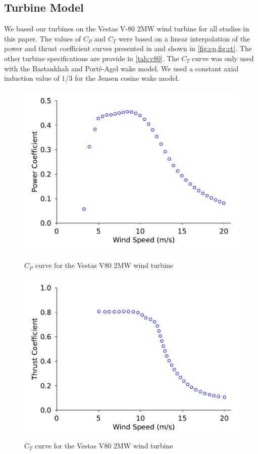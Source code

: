 \documentclass[a4paper]{jpconf}
\begin{document}
\subsection{Turbine Model}
We based our turbines on the Vestas V-80 2MW wind turbine for all studies in this paper. The values of $C_P$ and $C_T$ were based on a linear interpolation of the power and thrust coefficient curves presented in \cite{niayifar2016} and shown in \cref{fig:cp,fig:ct}. The other turbine specifications are provide in \cref{tab:v80}. The $C_T$ curve was only used with the Bastankhah and Port\'e-Agel wake model. We used a constant axial induction value of 1/3 for the Jensen cosine wake model.
%
\begin{figure}[htp]
	\centering
	\begin{minipage}[t]{0.48\textwidth}
		\centering
		\includegraphics[width=\textwidth, trim={0cm 0cm 0cm 0cm}, clip]{cp_curve_v80}
		\caption{$C_P$ curve for the Vestas V80 2MW wind turbine \cite{niayifar2016} }
		\label{fig:cp}
	\end{minipage}\hspace{1pc}%
	\begin{minipage}[t]{0.48\textwidth}
		\centering
		\includegraphics[width=\textwidth]{ct_curve_v80.pdf}
		\caption{$C_T$ curve for the Vestas V80 2MW wind turbine \cite{niayifar2016}}
		\label{fig:ct}
	\end{minipage} 
\end{figure}
\end{document}
